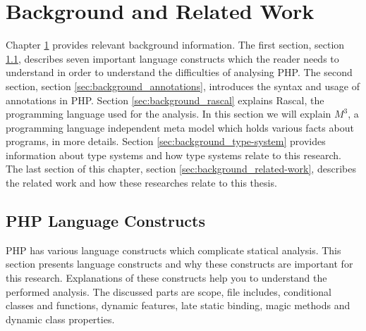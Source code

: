 \documentclass[../main.tex]{subfiles}
\begin{document}
    \chapter{Background and Related Work}\label{ch:background}
    Chapter \ref{ch:background} provides relevant background information.
    The first section, section \ref{sec:background_language-constructs}, describes seven important language constructs which the reader needs to understand in order to understand the difficulties of analysing PHP.
    The second section, section \ref{sec:background_annotations}, introduces the syntax and usage of annotations in PHP.
    Section \ref{sec:background_rascal} explains \Gls{Rascal}, the programming language used for the analysis.
    In this section we will explain $M^3$, a programming language independent meta model which holds various facts about programs, in more details.
    Section \ref{sec:background_type-system} provides information about type systems and how type systems relate to this research.
    The last section of this chapter, section \ref{sec:background_related-work}, describes the related work and how these researches relate to this thesis.

    \section{PHP Language Constructs}\label{sec:background_language-constructs}
    PHP has various language constructs which complicate statical analysis. 
    This section presents language constructs and why these constructs are important for this research.
    Explanations of these constructs help you to understand the performed analysis.
    The discussed parts are scope, file includes, conditional classes and functions, dynamic features, late static binding, magic methods and dynamic class properties.
    
\end{document}
